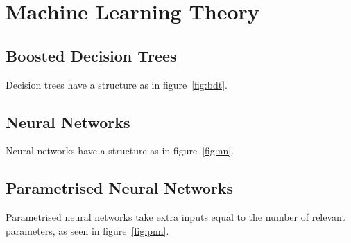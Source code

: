 \chapter{Machine Learning Theory}%
\label{sec:ml-theory}
\section{Boosted Decision Trees}%
\label{sec:bdts}
Decision trees have a structure as in figure~\ref{fig:bdt}.

\section{Neural Networks}%
\label{sec:neural-networks}
Neural networks have a structure as in figure~\ref{fig:nn}.

\section{Parametrised Neural Networks}%
\label{sec:param-neural-nets}
Parametrised neural networks take extra inputs equal to the number of relevant
parameters, as seen in figure~\ref{fig:pnn}.


